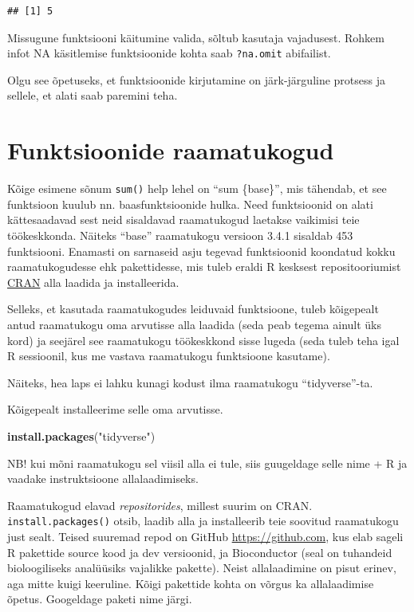 \documentclass[]{book}
\newenvironment{Shaded}{\begin{snugshade}}{\end{snugshade}}
\newcommand{\KeywordTok}[1]{\textcolor[rgb]{0.13,0.29,0.53}{\textbf{#1}}}
\newcommand{\StringTok}[1]{\textcolor[rgb]{0.31,0.60,0.02}{#1}}
\newcommand{\NormalTok}[1]{#1}
\begin{document}
\begin{verbatim}
## [1] 5
\end{verbatim}

Missugune funktsiooni käitumine valida, sõltub kasutaja vajadusest.
Rohkem infot NA käsitlemise funktsioonide kohta saab \texttt{?na.omit}
abifailist.

Olgu see õpetuseks, et funktsioonide kirjutamine on järk-järguline
protsess ja sellele, et alati saab paremini teha.

\section{Funktsioonide raamatukogud}\label{funktsioonide-raamatukogud}

Kõige esimene sõnum \texttt{sum()} help lehel on ``sum \{base\}'', mis
tähendab, et see funktsioon kuulub nn. baasfunktsioonide hulka. Need
funktsioonid on alati kättesaadavad sest neid sisaldavad raamatukogud
laetakse vaikimisi teie töökeskkonda. Näiteks ``base'' raamatukogu
versioon 3.4.1 sisaldab 453 funktsiooni. Enamasti on sarnaseid asju
tegevad funktsioonid koondatud kokku raamatukogudesse ehk pakettidesse,
mis tuleb eraldi R kesksest repositooriumist
\href{https://cran.r-project.org}{CRAN} alla laadida ja installeerida.

Selleks, et kasutada raamatukogudes leiduvaid funktsioone, tuleb
kõigepealt antud raamatukogu oma arvutisse alla laadida (seda peab
tegema ainult üks kord) ja seejärel see raamatukogu töökeskkond sisse
lugeda (seda tuleb teha igal R sessioonil, kus me vastava raamatukogu
funktsioone kasutame).

Näiteks, hea laps ei lahku kunagi kodust ilma raamatukogu
``tidyverse''-ta.

Kõigepealt installeerime selle oma arvutisse.

\begin{Shaded}
\begin{Highlighting}[]
\KeywordTok{install.packages}\NormalTok{(}\StringTok{"tidyverse"}\NormalTok{)}
\end{Highlighting}
\end{Shaded}

NB! kui mõni raamatukogu sel viisil alla ei tule, siis guugeldage selle
nime + R ja vaadake instruktsioone allalaadimiseks.

Raamatukogud elavad \emph{repositorides}, millest suurim on CRAN.
\texttt{install.packages()} otsib, laadib alla ja installeerib teie
soovitud raamatukogu just sealt. Teised suuremad repod on GitHub
\url{https://github.com}, kus elab sageli R pakettide source kood ja dev
versioonid, ja Bioconductor (seal on tuhandeid bioloogiliseks analüüsiks
vajalikke pakette). Neist allalaadimine on pisut erinev, aga mitte kuigi
keeruline. Kõigi pakettide kohta on võrgus ka allalaadimise õpetus.
Googeldage paketi nime järgi.
\end{document}
